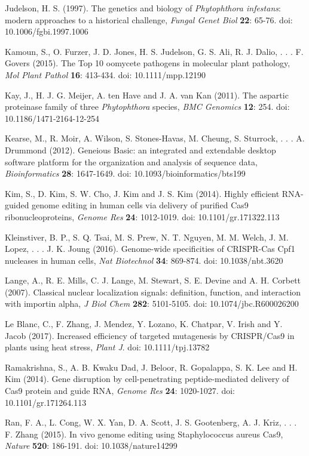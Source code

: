 \documentclass[onecolumn, 11pt,openany]{memoir}
\begin{document}
\begin{multicols}{2}
\begin{sloppy}
\begin{footnotesize}
Judelson, H. S. (1997). The genetics and biology of \textit{Phytophthora infestans}: modern approaches to a historical challenge, \textit{Fungal Genet Biol} \textbf{22}: 65-76. doi: 10.1006/fgbi.1997.1006

Kamoun, S., O. Furzer, J. D. Jones, H. S. Judelson, G. S. Ali, R. J. Dalio, . . . F. Govers (2015). The Top 10 oomycete pathogens in molecular plant pathology, \textit{Mol Plant Pathol} \textbf{16}: 413-434. doi: 10.1111/mpp.12190

Kay, J., H. J. G. Meijer, A. ten Have and J. A. van Kan (2011). The aspartic proteinase family of three \textit{Phytophthora }species, \textit{BMC Genomics} \textbf{12}: 254. doi: 10.1186/1471-2164-12-254

Kearse, M., R. Moir, A. Wilson, S. Stones-Havas, M. Cheung, S. Sturrock, . . . A. Drummond (2012). Geneious Basic: an integrated and extendable desktop software platform for the organization and analysis of sequence data, \textit{Bioinformatics} \textbf{28}: 1647-1649. doi: 10.1093/bioinformatics/bts199

Kim, S., D. Kim, S. W. Cho, J. Kim and J. S. Kim (2014). Highly efficient RNA-guided genome editing in human cells via delivery of purified Cas9 ribonucleoproteins, \textit{Genome Res} \textbf{24}: 1012-1019. doi: 10.1101/gr.171322.113

Kleinstiver, B. P., S. Q. Tsai, M. S. Prew, N. T. Nguyen, M. M. Welch, J. M. Lopez, . . . J. K. Joung (2016). Genome-wide specificities of CRISPR-Cas Cpf1 nucleases in human cells, \textit{Nat Biotechnol} \textbf{34}: 869-874. doi: 10.1038/nbt.3620

Lange, A., R. E. Mills, C. J. Lange, M. Stewart, S. E. Devine and A. H. Corbett (2007). Classical nuclear localization signals: definition, function, and interaction with importin alpha, \textit{J Biol Chem} \textbf{282}: 5101-5105. doi: 10.1074/jbc.R600026200

Le Blanc, C., F. Zhang, J. Mendez, Y. Lozano, K. Chatpar, V. Irish and Y. Jacob (2017). Increased efficiency of targeted mutagenesis by CRISPR/Cas9 in plants using heat stress, \textit{Plant J}. doi: 10.1111/tpj.13782

Ramakrishna, S., A. B. Kwaku Dad, J. Beloor, R. Gopalappa, S. K. Lee and H. Kim (2014). Gene disruption by cell-penetrating peptide-mediated delivery of Cas9 protein and guide RNA, \textit{Genome Res} \textbf{24}: 1020-1027. doi: 10.1101/gr.171264.113

Ran, F. A., L. Cong, W. X. Yan, D. A. Scott, J. S. Gootenberg, A. J. Kriz, . . . F. Zhang (2015). In vivo genome editing using Staphylococcus aureus Cas9, \textit{Nature} \textbf{520}: 186-191. doi: 10.1038/nature14299


\end{footnotesize}
\end{sloppy}
\end{multicols}
\end{document}
